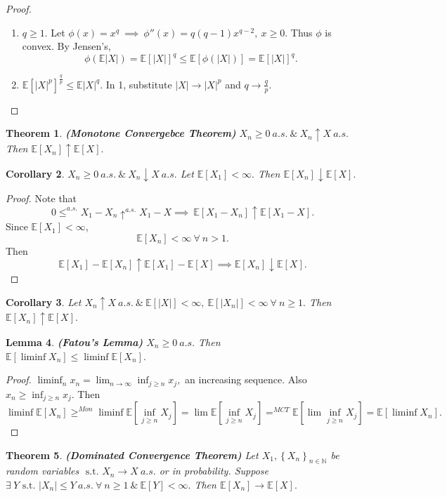 \documentclass{article}
\newcommand{\1}{\mathds{1}}
\newcommand{\E}{\mathbb{E}}
\newcommand{\N}{\mathbb{N}}
\newcommand{\lf}{\left}
\newcommand{\rg}{\right}
\newcommand{\f}[2]{\frac{#1}{#2}}
\newcommand{\en}[3]{\lf\{{#1}_{#2}\rg\}_{#2\in #3}}
\newcommand{\st}{\text{ s.t. }}
\newcommand{\card}[1]{\lf\vert #1\rg\vert}
\newcommand{\ar}{\ \&\ }
\newtheorem{theorem}{Theorem}[section]
\newtheorem{lemma}[theorem]{Lemma}
\newtheorem{corollary}[theorem]{Corollary}
\begin{document}
\begin{proof}
    \begin{enumerate}
        \item $q\geq 1.$ Let $\phi(x)=x^q\ \implies\ \phi''(x)=q(q-1)x^{q-2},\ x\geq 0.$ Thus $\phi$ is convex. By Jensen's, $$\phi(\E\card X)=\E[\card{X}]^q\leq \E[\phi(\card X)]=\E[\card X]^q.$$ 
        \item $\E[\card X^p]^{\f qp}\leq \E\card{X}^q.$ In 1, substitute $\card X\to\card X^p$ and $q\to \f qp.$
    \end{enumerate}
\end{proof}
\begin{theorem}\textbf{(Monotone Convergebce Theorem)}
    $X_n\geq 0\ a.s.\ar X_n\uparrow X\ a.s.$ Then $\E[X_n]\uparrow\E[X].$
\end{theorem}
\begin{corollary}
    $X_n\geq 0\ a.s.\ar X_n\downarrow X\ a.s.$ Let $\E[X_1]<\infty.$ Then $\E[X_n]\downarrow\E[X].$
\end{corollary}
\begin{proof}
    Note that $$0\leq^{a.s.}X_1-X_n\uparrow^{a.s.} X_1-X\implies\ \E[X_1-X_n]\uparrow\E[X_1-X].$$ Since $\E[X_1]<\infty$, $$\E[X_n]<\infty\ \forall\ n>1.$$ Then $$\E[X_1]-\E[X_n]\uparrow \E[X_1]-\E[X]\implies \E[X_n]\downarrow\E[X].$$
\end{proof}
\begin{corollary}
    Let $X_n\uparrow X\ a.s.\ar \E[\card{X}]<\infty,\ \E[\card{X_n}]<\infty\ \forall\ n\geq 1.$ Then $\E[X_n]\uparrow\E[X].$ 
\end{corollary}
\begin{lemma}\textbf{(Fatou's Lemma)}
    $X_n\geq 0\ a.s.$ Then $\E[\liminf X_n]\leq \liminf \E[X_n].$
\end{lemma}
\begin{proof}
    $\liminf_n x_n=\lim_{n\to\infty}\inf_{j\geq n}x_j,$ an increasing sequence. Also $x_n\geq\inf_{j\geq n}x_j.$ Then $$\liminf \E[X_n]\geq^{Mon}\liminf \E[\inf_{j\geq n}X_j]=\lim\E[\inf_{j\geq n}X_j]=^{MCT} \E[\lim \inf_{j\geq n} X_j]=\E[\liminf X_n].$$
\end{proof}
\begin{theorem}\textbf{(Dominated Convergence Theorem)}
    Let $X_1,\en Xn\N$ be random variables $\st X_n\to X\ a.s.$ or in probability. Suppose $\exists\ Y\st \card{X_n}\leq Y\ a.s.\ \forall\ n\geq 1\ar \E[Y]<\infty.$ Then $\E[X_n]\to\E[X].$
\end{theorem}
\end{document}
